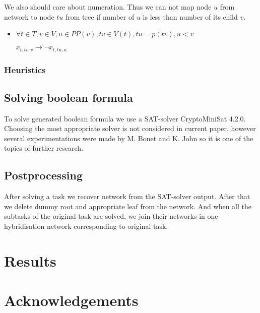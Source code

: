 \documentclass[runningheads, envcountsame, a4paper]{llncs}
\begin{document}
\begin{itemize}
	We also should care about numeration. Thus we can not map node $u$ from network to node $tu$ from tree if number of $u$ is less than number of its child $v$.

	\begin{itemize}
    \item $\forall t \in T, v \in V, u \in PP(v), tv \in V(t), tu = p(tv), u < v$

    $x_{t,tv,v} \rightarrow \neg x_{t,tu,u}$
	\end {itemize}
	
\end {itemize}

\subsubsection{Heuristics}

\subsection{Solving boolean formula}

To solve generated boolean formula we use a SAT-solver CryptoMiniSat 4.2.0. Choosing the most appropriate solver is not considered in current paper, however several experimentations were made by M. Bonet and K. John \cite {bonet2009efficiently} so it is one of the topics of further research.

\subsection{Postprocessing}

After solving a task we recover network from the SAT-solver output. After that we delete dummy root and appropriate leaf from the network. And when all the subtasks of the original task are solved, we join their networks in one hybridisation network corresponding to original task.

\section{Results}

\section*{Acknowledgements}



\clearpage
\end{document}
